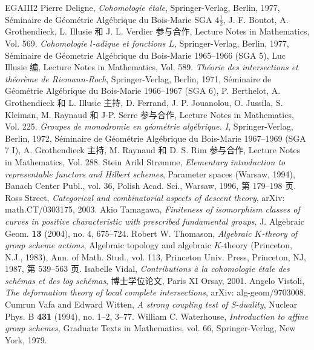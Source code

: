 \begin{thebibliography}{EGAIII2}
 Pierre Deligne, \emph{Cohomologie étale}, Springer-Verlag, Berlin, 1977, Séminaire de Géométrie Algébrique du Bois-Marie SGA $4\frac12$, J. F. Boutot, A. Grothendieck, L. Illusie 和 J. L. Verdier 参与合作, Lecture Notes in Mathematics, Vol. 569.
 \emph{Cohomologie $l$-adique et fonctions $L$}, Springer-Verlag, Berlin, 1977, Séminaire de Géometrie Algébrique du Bois-Marie 1965--1966 (SGA 5), Luc Illusie 编, Lecture Notes in Mathematics, Vol. 589.
 \emph{Théorie des intersections et théorème de Riemann-Roch}, Springer-Verlag, Berlin, 1971, Séminaire de Géométrie Algébrique du Bois-Marie 1966--1967 (SGA 6), P. Berthelot, A. Grothendieck 和 L. Illusie 主持, D. Ferrand, J. P. Jouanolou, O. Jussila, S. Kleiman, M. Raynaud 和 J-P. Serre 参与合作, Lecture Notes in Mathematics, Vol. 225.
 \emph{Groupes de monodromie en géométrie algébrique. I}, Springer-Verlag, Berlin, 1972, Séminaire de Géométrie Algébrique du Bois-Marie 1967--1969 (SGA 7 I), A. Grothendieck 主持, M. Raynaud 和 D. S. Rim 参与合作, Lecture Notes in Mathematics, Vol. 288.
 Stein Arild Strømme, \emph{Elementary introduction to representable functors and Hilbert schemes}, Parameter spaces (Warsaw, 1994), Banach Center Publ., vol. 36, Polish Acad. Sci., Warsaw, 1996, 第 179--198 页.
 Ross Street, \emph{Categorical and combinatorial aspects of descent theory}, arXiv: math.CT/0303175, 2003.
 Akio Tamagawa, \emph{Finiteness of isomorphism classes of curves in positive characteristic with prescribed fundamental groups}, J. Algebraic Geom. \textbf{13} (2004), no. 4, 675--724.
 Robert W. Thomason, \emph{Algebraic $K$-theory of group scheme actions}, Algebraic topology and algebraic $K$-theory (Princeton, N.J., 1983), Ann. of Math. Stud., vol. 113, Princeton Univ. Press, Princeton, NJ, 1987, 第 539--563 页.
 Isabelle Vidal, \emph{Contributions à la cohomologie étale des schémas et des log schémas}, 博士学位论文, Paris XI Orsay, 2001.
 Angelo Vistoli, \emph{The deformation theory of local complete intersections}, arXiv: alg-geom/9703008.
 Cumrun Vafa and Edward Witten, \emph{A strong coupling test of S-duality}, Nuclear Phys. B \textbf{431} (1994), no. 1--2, 3--77.
 William C. Waterhouse, \emph{Introduction to affine group schemes}, Graduate Texts in Mathematics, vol. 66, Springer-Verlag, New York, 1979.

\end{thebibliography}

